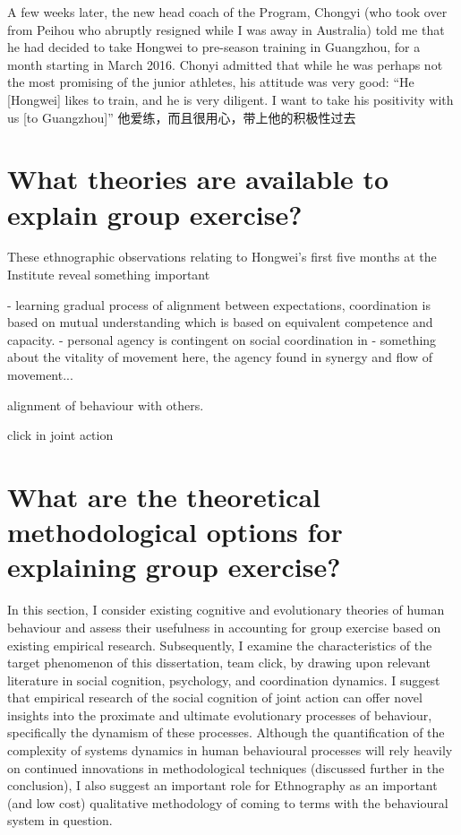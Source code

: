 
A few weeks later, the new head coach of the Program, Chongyi (who took over from Peihou who abruptly resigned while I was away in Australia) told me that he had decided to take Hongwei to pre-season training in Guangzhou, for a month starting in March 2016.  Chonyi admitted that while he was perhaps not the most promising of the junior athletes, his attitude was very good: ``He [Hongwei] likes to train, and he is very diligent. I want to take his positivity with us [to Guangzhou]'' 他爱练，而且很用心，带上他的积极性过去


\section{What theories are available to explain group exercise?}


These ethnographic observations relating to Hongwei's first five months at the Institute reveal something important

- learning gradual process of alignment between expectations, coordination is based on mutual understanding which is based on equivalent competence and capacity.
- personal agency is contingent on social coordination in
- something about the vitality of movement here, the agency found in synergy and flow of movement...

alignment of behaviour with others.

click in joint action




\section{What are the theoretical methodological options for explaining group exercise?}

In this section, I consider existing cognitive and evolutionary theories of human behaviour and assess their usefulness in accounting for group exercise based on existing empirical research.  Subsequently, I examine the characteristics of the target phenomenon of this dissertation, team click, by drawing upon relevant literature in social cognition, psychology, and coordination dynamics.  I suggest that empirical research of the social cognition of joint action can offer novel insights into the proximate and ultimate evolutionary processes of behaviour, specifically the dynamism of these processes.  Although the quantification of the complexity of systems dynamics in human behavioural processes will rely heavily on continued innovations in methodological techniques (discussed further in the conclusion), I also suggest an important role for Ethnography as an important (and low cost) qualitative methodology of coming to terms with the behavioural system in question.


